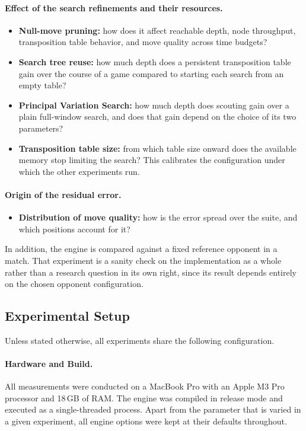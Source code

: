 \paragraph{Effect of the search refinements and their resources.}
\begin{itemize}
    \item \textbf{Null-move pruning:} how does it affect reachable depth, node
    throughput, transposition table behavior, and move quality across time
    budgets?
    \item \textbf{Search tree reuse:} how much depth does a persistent
    transposition table gain over the course of a game compared to starting each
    search from an empty table?
    \item \textbf{Principal Variation Search:} how much depth does scouting gain
    over a plain full-window search, and does that gain depend on the choice of
    its two parameters?
    \item \textbf{Transposition table size:} from which table size onward does
    the available memory stop limiting the search? This calibrates the
    configuration under which the other experiments run.
\end{itemize}

\paragraph{Origin of the residual error.}
\begin{itemize}
    \item \textbf{Distribution of move quality:} how is the error spread over the
    suite, and which positions account for it?
\end{itemize}

In addition, the engine is compared against a fixed reference opponent in a match.
That experiment is a sanity check on the implementation as a whole rather than a
research question in its own right, since its result depends entirely on the
chosen opponent configuration.

\subsection{Experimental Setup}
\label{subsec:common_setup}

Unless stated otherwise, all experiments share the following configuration.

\paragraph{Hardware and Build.}
All measurements were conducted on a MacBook Pro with an Apple M3 Pro processor
and 18\,GB of RAM. The engine was compiled in release mode and executed as a
single-threaded process. Apart from the parameter that is varied in a given
experiment, all engine options were kept at their defaults throughout.

